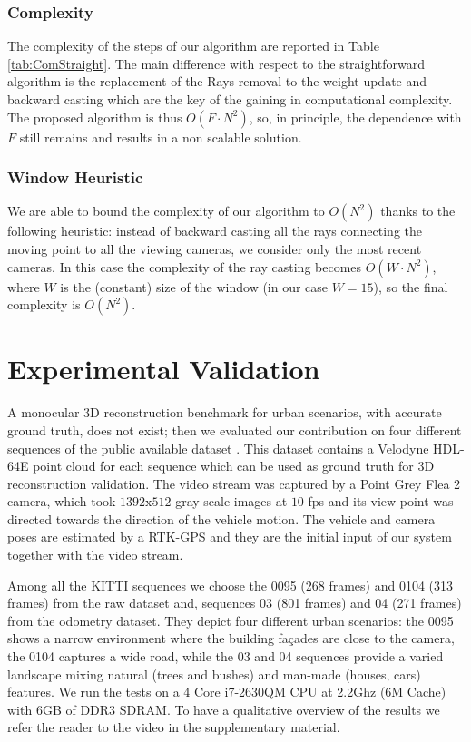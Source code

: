 \subsubsection{Complexity}
The complexity of the steps of our algorithm are reported in Table \ref{tab:ComStraight}. The main difference with respect to the straightforward algorithm is the replacement of the Rays removal to the weight update and backward casting which are the key of the gaining in computational complexity.
The proposed algorithm is thus $O(F\cdot N^2)$, so, in principle, the dependence with $F$ still remains and results in a non scalable solution. 

\subsubsection{Window Heuristic}
\label{subsub:window}
We are able to bound the complexity of our algorithm to $O(N^2)$ thanks to the following heuristic: instead of backward casting all the rays connecting the moving point to all the viewing cameras, we consider only the most recent cameras.
In this case the complexity of the ray casting becomes  $O(W\cdot N^2)$, where $W$ is the (constant) size  of the window (in our case $W = 15$), so the final complexity is $O(N^2)$.



\section{Experimental Validation}

A monocular 3D reconstruction benchmark for urban scenarios, with accurate ground truth, does not exist; then we evaluated our contribution on four different sequences of the public available dataset \cite{Geiger_et_al12}. 
This dataset contains a Velodyne HDL-64E point cloud for each sequence which can be used as ground truth for 3D reconstruction validation.
The video stream was captured by a Point Grey Flea 2 camera, which took $1392\text{x}512$ gray scale images at $10$ fps and its view point was directed towards the direction of the vehicle motion. 
The vehicle and camera poses are estimated by a RTK-GPS and they are the initial input of our system together with the video stream.

Among all the KITTI sequences we choose the 0095 (268 frames) and 0104 (313 frames) from the raw dataset and, sequences 03 (801 frames) and 04 (271 frames) from the odometry dataset. 
They depict four different urban scenarios: the 0095 shows a narrow environment where the building fa\c{c}ades are close to the camera, the 0104 captures a wide road, while the 03 and 04 sequences provide a varied landscape mixing natural (trees and bushes) and man-made (houses, cars) features.
We run the tests on a 4 Core i7-2630QM CPU at 2.2Ghz (6M Cache) with 6GB of DDR3 SDRAM. To have a qualitative overview of the results we refer the reader to the video in the supplementary material. 
